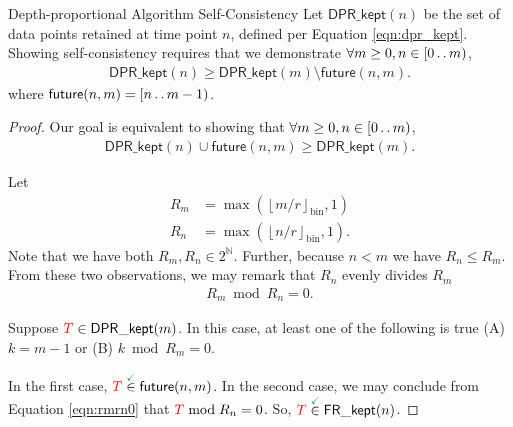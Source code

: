 \begin{theorem}{Depth-proportional Algorithm Self-Consistency}
\label{thm:depth-proportional-algo-self-consistency}
Let $\mathsf{DPR\_kept}(n)$ be the set of data points retained at time point $n$, defined per Equation \ref{eqn:dpr_kept}.
Showing self-consistency requires that we demonstrate $\forall m \geq 0, n \in [0 \mathinner {\ldotp \ldotp} m)$,
\begin{align*}
\mathsf{DPR\_kept}(n)
\geq
\mathsf{DPR\_kept}(m)
\setminus
\mathsf{future}(n, m).
\end{align*}
where $\mathsf{future}(n, m) = [n \mathinner {\ldotp \ldotp} m - 1)$.
\end{theorem}

\begin{proof}
\label{prf:depth-proportional-algo-self-consistency}
Our goal is equivalent to showing that $\forall m \geq 0, n \in [0 \mathinner {\ldotp \ldotp} m)$,
\begin{align*}
\mathsf{DPR\_kept}(n) \cup \mathsf{future}(n, m) \geq \mathsf{DPR\_kept}(m).
\end{align*}

Let
\begin{align*}
R_m
&=
\max(\left\lfloor m / r \right\rfloor_{\mathrm{bin}}, 1)\\
R_n
&=
\max(\left\lfloor n / r \right\rfloor_{\mathrm{bin}}, 1).
\end{align*}
Note that we have both $R_m, R_n \in 2^{\mathbb{N}}$.
Further, because $n < m$ we have $R_n \leq R_m$.
From these two observations, we may remark that $R_n$ evenly divides $R_m$
\begin{align}
R_m \bmod R_n = 0.
\label{eqn:rmrn0}
\end{align}

Suppose $\colorTbar \in \mathsf{DPR\_kept}(m)$.
In this case, at least one of the following is true (A) $k = m - 1$ or (B) $k \bmod R_m = 0$.

In the first case, $\colorTbar \stackrel{\checkmark}{\in} \mathsf{future}(n, m)$.
In the second case, we may conclude from Equation \ref{eqn:rmrn0} that $\colorTbar \bmod R_n = 0$.
So, $\colorTbar \stackrel{\checkmark}{\in} \mathsf{FR\_kept}(n)$.
\end{proof}

